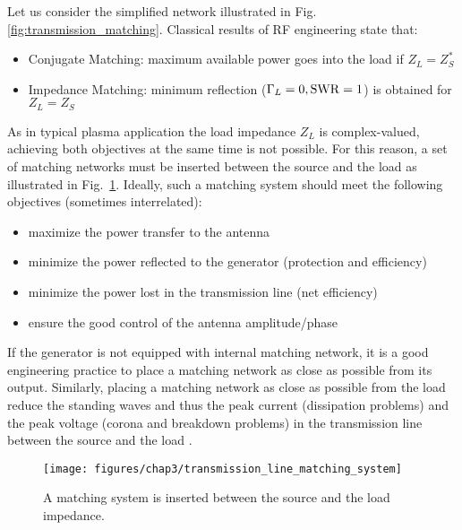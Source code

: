 Let us consider the simplified network illustrated in Fig.\ref{fig:transmission_matching}. Classical results of RF engineering state that\cite{Rizzi1988, pozar2012}:
\begin{itemize}
	\item Conjugate Matching: maximum available power goes into the load if $Z_L=Z_S^*$
	\item Impedance Matching: minimum reflection ($\Gamma_L=0, {\mathrm{SWR}}=1$) is obtained for $Z_L=Z_S$
\end{itemize} 
As in typical plasma application the load impedance $Z_L$ is complex-valued, achieving both objectives at the same time is not possible. For this reason, a set of matching networks must be inserted between the source and the load as illustrated in Fig.~\ref{fig:transmission_matching_system}. Ideally, such a matching system should meet the following objectives (sometimes interrelated):
\begin{itemize}
	\item maximize the power transfer to the antenna 
	\item minimize the power reflected to the generator (protection and efficiency)
	\item minimize the power lost in the transmission line (net efficiency)
	\item ensure the good control of the antenna amplitude/phase
\end{itemize}

If the generator is not equipped with internal matching network, it is a good engineering practice to place a matching network as close as possible from its output. Similarly, placing a matching network as close as possible from the load reduce the standing waves and thus the peak current (dissipation problems) and the peak voltage (corona and breakdown problems) in the transmission line between the source and the load \cite[§4]{Rizzi1988}.

\begin{figure}
	\texttt{[image: figures/chap3/transmission\_line\_matching\_system]}
	\caption{A matching system is inserted between the source and the load impedance.}
	\label{fig:transmission_matching_system}
\end{figure}

